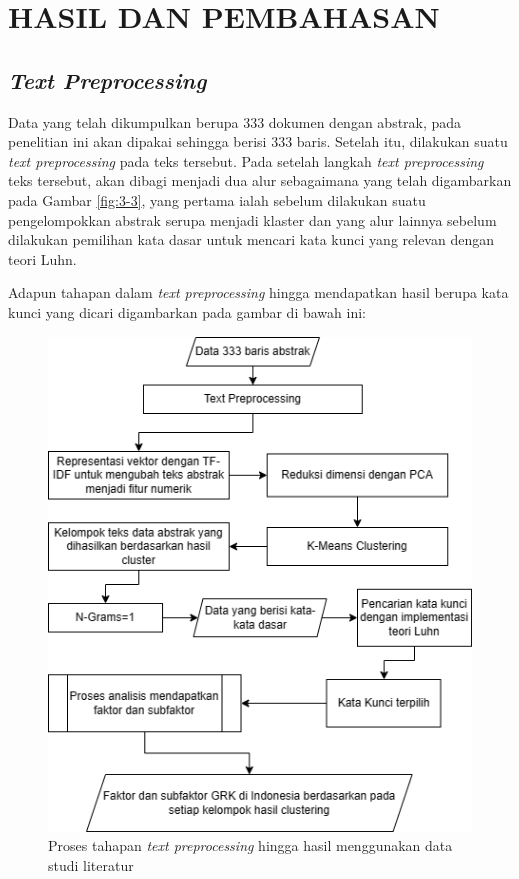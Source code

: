 \chapter{HASIL DAN PEMBAHASAN}
\label{BAB4:hasil}

\section{\textit{Text Preprocessing}}

Data yang telah dikumpulkan berupa 333 dokumen dengan abstrak, pada penelitian ini akan dipakai sehingga berisi 333 baris. Setelah itu, dilakukan suatu \textit{text preprocessing} pada teks tersebut. Pada setelah langkah \textit{text preprocessing} teks tersebut, akan dibagi menjadi dua alur sebagaimana yang telah digambarkan pada Gambar \ref{fig:3-3}, yang pertama ialah sebelum dilakukan suatu pengelompokkan abstrak serupa menjadi klaster dan yang alur lainnya sebelum dilakukan pemilihan kata dasar untuk mencari kata kunci yang relevan dengan teori Luhn.

Adapun tahapan dalam \textit{text preprocessing} hingga mendapatkan hasil berupa kata kunci yang dicari digambarkan pada gambar di bawah ini:
\begin{figure}[H]
    \centering
    \includegraphics[width=0.75\linewidth]{img/bab4-1.png}
    \caption{Proses tahapan \textit{text preprocessing} hingga hasil menggunakan data studi literatur}
    \label{fig:4-1}
\end{figure}

